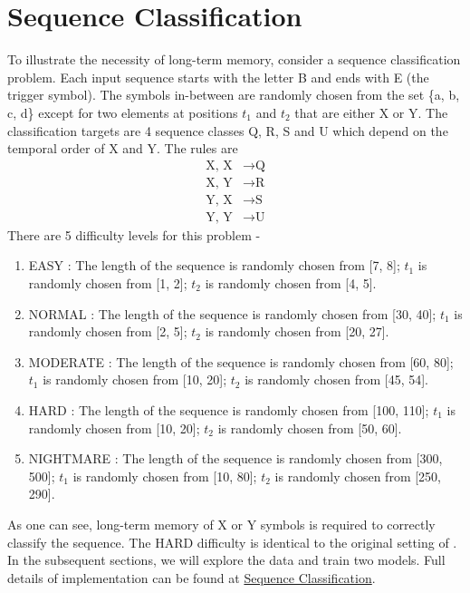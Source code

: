 \section{Sequence Classification}
\label{sec:SeqClassification}
To illustrate the necessity of long-term memory, consider a sequence classification problem. 
Each input sequence starts with the letter B and ends with E (the trigger symbol). 
The symbols in-between are randomly chosen from the set \{a, b, c, d\} except for two elements at positions $t_1$ and $t_2$ that are either X or Y. 
The classification targets are 4 sequence classes Q, R, S and U which depend on the temporal order of X and Y. 
The rules are
\begin{align*}
    \text{X, X} &\rightarrow \text{Q} \\
    \text{X, Y} &\rightarrow \text{R} \\
    \text{Y, X} &\rightarrow \text{S} \\
    \text{Y, Y} &\rightarrow \text{U}
\end{align*}
There are 5 difficulty levels for this problem -
\begin{enumerate}
    \item EASY : The length of the sequence is randomly chosen from [7, 8]; $t_1$ is randomly chosen from [1, 2]; $t_2$ is randomly chosen from [4, 5].
    \item NORMAL : The length of the sequence is randomly chosen from [30, 40]; $t_1$ is randomly chosen from [2, 5]; $t_2$ is randomly chosen from [20, 27].
    \item MODERATE : The length of the sequence is randomly chosen from [60, 80]; $t_1$ is randomly chosen from [10, 20]; $t_2$ is randomly chosen from [45, 54].
    \item HARD : The length of the sequence is randomly chosen from [100, 110]; $t_1$ is randomly chosen from [10, 20]; $t_2$ is randomly chosen from [50, 60].
    \item NIGHTMARE : The length of the sequence is randomly chosen from [300, 500]; $t_1$ is randomly chosen from [10, 80]; $t_2$ is randomly chosen from [250, 290].
\end{enumerate}
As one can see, long-term memory of X or Y symbols is required to correctly classify the sequence. 
The HARD difficulty is identical to the original setting of \cite{article-lstm}.
In the subsequent sections, we will explore the data and train two models. 
Full details of implementation can be found at \href{https://github.com/Atcold/pytorch-Deep-Learning-Minicourse/blob/master/08-seq_classification.ipynb}{Sequence Classification}.

